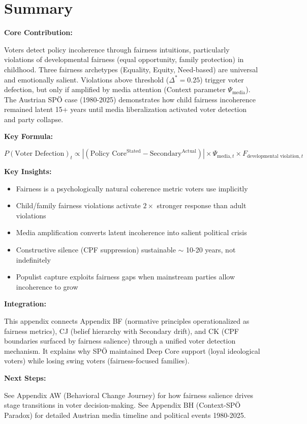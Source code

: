 \section{Summary}
\label{sec:cm-summary}

\begin{tcolorbox}[colback=green!10!white, colframe=green!75!black,
    title=\textbf{Appendix CM: Summary}]

\textbf{Core Contribution:}

Voters detect policy incoherence through fairness intuitions, particularly violations of
developmental fairness (equal opportunity, family protection) in childhood. Three fairness
archetypes (Equality, Equity, Need-based) are universal and emotionally salient. Violations
above threshold ($\Delta^* = 0.25$) trigger voter defection, but only if amplified by media
attention (Context parameter $\Psi_{\text{media}}$). The Austrian SPÖ case (1980-2025)
demonstrates how child fairness incoherence remained latent 15+ years until media liberalization
activated voter detection and party collapse.

\textbf{Key Formula:}

\begin{equation}
P(\text{Voter Defection})_t \propto |(\text{Policy Core}^{\text{Stated}} - \text{Secondary}^{\text{Actual}})| \times \Psi_{\text{media},t} \times F_{\text{developmental violation},t}
\end{equation}

\textbf{Key Insights:}

\begin{itemize}[nosep]
\item Fairness is a psychologically natural coherence metric voters use implicitly
\item Child/family fairness violations activate $2\times$ stronger response than adult violations
\item Media amplification converts latent incoherence into salient political crisis
\item Constructive silence (CPF suppression) sustainable $\sim$ 10-20 years, not indefinitely
\item Populist capture exploits fairness gaps when mainstream parties allow incoherence to grow
\end{itemize}

\textbf{Integration:}

This appendix connects Appendix BF (normative principles operationalized as fairness metrics),
CJ (belief hierarchy with Secondary drift), and CK (CPF boundaries surfaced by fairness salience)
through a unified voter detection mechanism. It explains why SPÖ maintained Deep Core support
(loyal ideological voters) while losing swing voters (fairness-focused families).

\textbf{Next Steps:}

See Appendix AW (Behavioral Change Journey) for how fairness salience drives stage transitions
in voter decision-making. See Appendix BH (Context-SPÖ Paradox) for detailed Austrian media
timeline and political events 1980-2025.

\end{tcolorbox}

